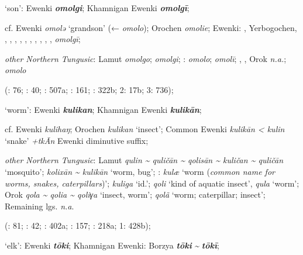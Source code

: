 \documentclass[output=paper,colorlinks,citecolor=brown]{langscibook}
\begin{document}
\begin{xlist}
    \ex  ‘son’:  Ewenki \textbf{\textit{omolgi}}; Khamnigan Ewenki \textbf{\textit{omolgī}};

    cf.  Ewenki \textit{omolǝ} ‘grandson’ (←  \textit{omolo}); Orochen \textit{omolie};  Ewenki: , Yerbogochen, , , , , , , , , , ,  \textit{omolgī};

    \textit{other Northern Tungusic}: Lamut \textit{omolgo};  \textit{omolgi}; \textit{}:  \textit{omolo};  \textit{omolī}; , , Orok \textit{n.a.};  \textit{omolo}
    
    (\citealt{Castrén1856}: 76; \citealt{Janhunen1991}: 40; \citealt{Dorji1998}: 507a; \citealt{Chaoke2014a}: 161; \citealt{Vasilevic1958}: 322b; \citealt{Cincius1975B} 2: 17b; \citealt{Hauer1952} 3: 736); 

    \ex  ‘worm’:  Ewenki \textbf{\textit{kulikan}}; Khamnigan Ewenki \textbf{\textit{kulikān}};

    cf.  Ewenki \textit{kulihaŋ}; Orochen \textit{kulikan} ‘insect’;  Common Ewenki \textit{kulikān < kulin} ‘snake’ \textit{+tkĀn} Ewenki diminutive suffix;

    \textit{other Northern Tungusic}: Lamut \textit{qulin {\textasciitilde} quličān {\textasciitilde} qolisān {\textasciitilde} kuličan {\textasciitilde} quličān} ‘mosquito’;  \textit{kolixān {\textasciitilde} kulikān} ‘worm, bug’; \textit{}:  \textit{kulæ} ‘worm (\textit{common name for worms, snakes, caterpillars})’;  \textit{kuliga} ‘id.’;  \textit{qoli} ‘kind of aquatic insect’, \textit{qula} ‘worm’; Orok \textit{qola {\textasciitilde} qolia {\textasciitilde} qoliγa} ‘insect, worm’;  \textit{qolã} ‘worm; caterpillar; insect’; Remaining lgs. \textit{n.a}. 
    
    (\citealt{Castrén1856}: 81; \citealt{Janhunen1991}: 42; \citealt{Dorji1998}: 402a; \citealt{Chaoke2014a}: 157; \citealt{Vasilevic1958}: 218a; \citealt{Cincius1975B} 1: 428b);

    \ex  ‘elk’:  Ewenki \textbf{\textit{tōki}}; Khamnigan Ewenki: Borzya \textbf{\textit{tōki}} \textit{{\textasciitilde}} \textbf{\textit{tōkī}};


\end{xlist}
\end{document}
